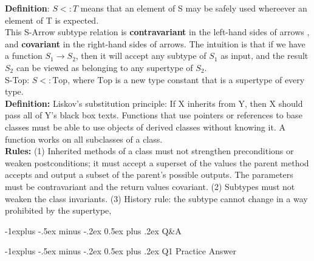 \documentclass[letterpaper, 8pt]{extarticle}
\makeatletter
\renewcommand{\section}{\@startsection{section}{1}{0mm}%
                                {-1explus -.5ex minus -.2ex}%
                                {0.5ex plus .2ex}%
                                {\normalfont\normalsize\bfseries}}
\renewcommand{\subsection}{\@startsection{subsection}{2}{0mm}%
                                {-1explus -.5ex minus -.2ex}%
                                {0.5ex plus .2ex}%
                                {\normalfont\small\bfseries}}
\makeatother
\begin{document}
\begin{multicols*}{4}
    \textbf{Definition}: $S <: T$ means that an element of S may be safely used whereever an element of T is expected.\\
    This S-Arrow subtype relation is \textbf{contravariant} in the left-hand sides of arrows , and
    \textbf{covariant} in the right-hand sides of arrows.
    The intuition is that if we have a function \(S_1 \to S_2\),
    then it will accept any subtype of \(S_1\) as input,
    and the result \(S_2\) can be viewed as belonging to any supertype of \(S_2\).\\
    S-Top: \(S<: \text{Top}\), where \(\text{Top}\) is a new type constant that is a supertype of every type.\\
    \textbf{Definition:} Liskov's substitution principle: If X inherits from Y, then X should pass
    all of Y's black box texts. Functions that use pointers or references to base classes must be able to use objects of derived classes without knowing it. A function works on all subclasses of a class. \\
    \textbf{Rules:} (1) Inherited methods of a class must not strengthen preconditions or weaken
    postconditions; it must accept a superset of the values the parent method accepts and output a subset
    of the parent’s possible outputs. The parameters must be contravariant and the return values covariant.
    (2) Subtypes must not weaken the class invariants. (3) History rule: the subtype cannot change in a
    way prohibited by the supertype,

    \section{Q\&A}

    \subsection{Q1 Practice Answer}


\end{multicols*}
\end{document}
